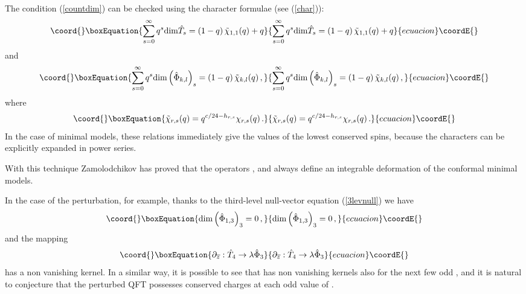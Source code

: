 \documentclass[a4paper,12pt]{report}
\begin{document}
The condition (\ref{countdim}) can be checked using the character formulae (see (\ref{char})):
\begin{equation}\coord{}\boxEquation{
\sum_{s=0}^{\infty}q^{s}\textrm{dim}\hat{T}_{s}=\left(1-q\right)\tilde{\chi}_{1,1}(q)+q
}{
\sum_{s=0}^{\infty}q^{s}\textrm{dim}\hat{T}_{s}=\left(1-q\right)\tilde{\chi}_{1,1}(q)+q
}{ecuacion}\coordE{}\end{equation}
and
\begin{equation}\coord{}\boxEquation{
\sum_{s=0}^{\infty}q^{s}\textrm{dim}\left(\hat{\Phi}_{k,l}\right)_{s}=\left(1-q\right)\tilde{\chi}_{k,l}(q)\,,
}{
\sum_{s=0}^{\infty}q^{s}\textrm{dim}\left(\hat{\Phi}_{k,l}\right)_{s}=\left(1-q\right)\tilde{\chi}_{k,l}(q)\,,
}{ecuacion}\coordE{}\end{equation}
where
\begin{equation}\coord{}\boxEquation{
\tilde{\chi}_{r,s}(q)=q^{c/24-h_{r,s}}\chi_{r,s}(q)\,.
}{
\tilde{\chi}_{r,s}(q)=q^{c/24-h_{r,s}}\chi_{r,s}(q)\,.
}{ecuacion}\coordE{}\end{equation}
In the case of minimal models, these relations immediately give the values of the lowest conserved spins, because
the characters can be explicitly expanded in power series.

\vspace{0.5cm}

With this technique Zamolodchikov has proved that the operators \coordHE{}, \coordHE{} and \coordHE{} always
define an integrable deformation of the conformal minimal models.

In the case of the \coordHE{} perturbation, for example, thanks to the third-level null-vector equation
(\ref{3levnull}) we have
\begin{equation}\coord{}\boxEquation{
\textrm{dim}\left(\hat{\Phi}_{1,3}\right)_{3}=0\,,
}{
\textrm{dim}\left(\hat{\Phi}_{1,3}\right)_{3}=0\,,
}{ecuacion}\coordE{}\end{equation} and the mapping
\begin{equation}\coord{}\boxEquation{
\partial_{\overline{z}}:\hat{T}_{4}\rightarrow\lambda \hat{\Phi}_{3}
}{
\partial_{\overline{z}}:\hat{T}_{4}\rightarrow\lambda \hat{\Phi}_{3}
}{ecuacion}\coordE{}\end{equation}
has a non vanishing kernel. In a similar way, it is possible to see that \coordHE{} has non
vanishing kernels also for the next few odd \coordHE{}, and it is natural to conjecture that the perturbed QFT possesses
conserved charges at each odd value of \coordHE{}.
\end{document}
